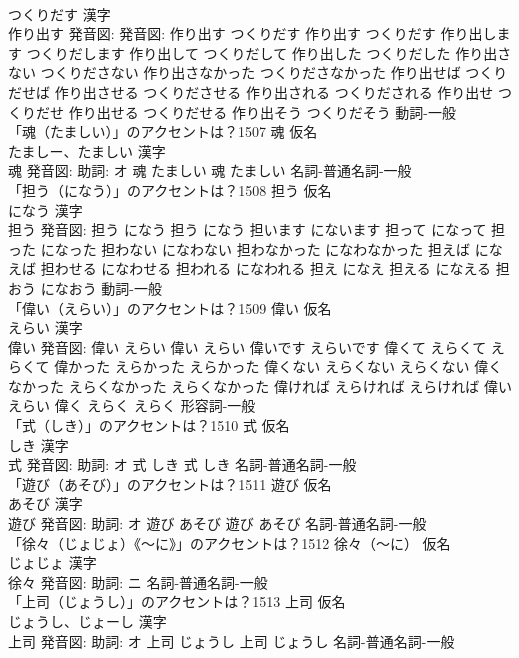 \documentclass[8pt]{extreport}
\begin{document}
\begin{CJK}{UTF8}{min}
\\	つくりだす 漢字　
\\	作り出す 発音図: 発音図:	作り出す つくりだす		作り出す つくりだす 作り出します つくりだします 作り出して つくりだして 作り出した つくりだした 作り出さない つくりださない 作り出さなかった つくりださなかった 作り出せば つくりだせば 作り出させる つくりださせる 作り出される つくりだされる 作り出せ つくりだせ 作り出せる つくりだせる 作り出そう つくりだそう				動詞-一般 
\\	「魂（たましい）」のアクセントは？1507	魂 仮名　
\\	たましー、たましい 漢字　
\\	魂 発音図: 助詞: オ	魂 たましい		魂 たましい				名詞-普通名詞-一般 
\\	「担う（になう）」のアクセントは？1508	担う 仮名　
\\	になう 漢字　
\\	担う 発音図:	担う になう		担う になう 担います にないます 担って になって 担った になった 担わない になわない 担わなかった になわなかった 担えば になえば 担わせる になわせる 担われる になわれる 担え になえ 担える になえる 担おう になおう				動詞-一般 
\\	「偉い（えらい）」のアクセントは？1509	偉い 仮名　
\\	えらい 漢字　
\\	偉い 発音図:	偉い えらい		偉い えらい 偉いです えらいです 偉くて えらくて えらくて 偉かった えらかった えらかった 偉くない えらくない えらくない 偉くなかった えらくなかった えらくなかった 偉ければ えらければ えらければ 偉い えらい 偉く えらく えらく				形容詞-一般 
\\	「式（しき）」のアクセントは？1510	式 仮名　
\\	しき 漢字　
\\	式 発音図: 助詞: オ	式 しき		式 しき				名詞-普通名詞-一般 
\\	「遊び（あそび）」のアクセントは？1511	遊び 仮名　
\\	あそび 漢字　
\\	遊び 発音図: 助詞: オ	遊び あそび		遊び あそび				名詞-普通名詞-一般 
\\	「徐々（じょじょ）《〜に》」のアクセントは？1512	徐々（〜に） 仮名　
\\	じょじょ 漢字　
\\	徐々 発音図: 助詞: ニ							名詞-普通名詞-一般 
\\	「上司（じょうし）」のアクセントは？1513	上司 仮名　
\\	じょうし、じょーし 漢字　
\\	上司 発音図: 助詞: オ	上司 じょうし		上司 じょうし				名詞-普通名詞-一般 

\end{CJK}
\end{document}
